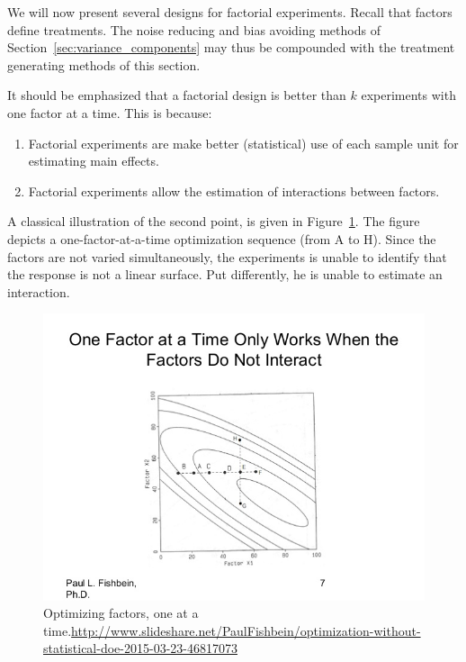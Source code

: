 We will now present several designs for factorial experiments.
Recall that factors define treatments. The noise reducing and bias avoiding methods of Section~\ref{sec:variance_components} may thus be compounded with the treatment generating methods of this section.

It should be emphasized that a factorial design is better than $k$ experiments with one factor at a time. This is because:
\begin{enumerate}
\item Factorial experiments are make better (statistical) use of each sample unit for estimating main effects.
\item Factorial experiments allow the estimation of interactions between factors. 
\end{enumerate}
A classical illustration of the second point, is given in Figure~\ref{fig:one_factor_at_a_time}.
The figure depicts a one-factor-at-a-time optimization sequence (from A to H). Since the factors are not varied simultaneously, the experiments is unable to identify that the response is not a linear surface. 
Put differently, he is unable to estimate an interaction.

\begin{figure}[ht]
\centering
\includegraphics[height=0.3\textheight]{art/optimization-without-statistical-doe-2015-03-23-7-638}
\caption{Optimizing factors, one at a time.\newline \url{http://www.slideshare.net/PaulFishbein/optimization-without-statistical-doe-2015-03-23-46817073}}
\label{fig:one_factor_at_a_time}
\end{figure}




